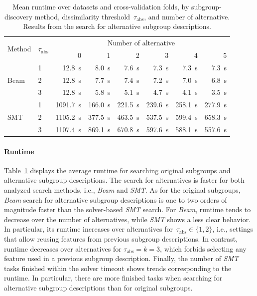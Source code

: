 \documentclass{article}
\theoremstyle{definition}
\begin{document}
\begin{table}[t]
	\centering
	\begin{tabular}{llrrrrrr}
		\toprule
		\multirow{2}{*}{Method} & \multirow{2}{*}{$\tau_{\text{abs}}$} & \multicolumn{6}{c}{Number of alternative} \\
		\cmidrule(lr){3-8}
		& &  0 & 1 & 2 & 3 & 4 & 5 \\
		\midrule
		\multirow[t]{3}{*}{Beam} & 1 & 12.8~s & 8.0~s & 7.6~s & 7.3~s & 7.3~s & 7.3~s \\
		& 2 & 12.8~s & 7.7~s & 7.4~s & 7.2~s & 7.0~s & 6.8~s \\
		& 3 & 12.8~s & 5.8~s & 5.1~s & 4.7~s & 4.1~s & 3.5~s \\
		\multirow[t]{3}{*}{SMT} & 1 & 1091.7~s & 166.0~s & 221.5~s & 239.6~s & 258.1~s & 277.9~s \\
		& 2 & 1105.2~s & 377.5~s & 463.5~s & 537.5~s & 599.4~s & 658.3~s \\
		& 3 & 1107.4~s & 869.1~s & 670.8~s & 597.6~s & 588.1~s & 557.6~s \\
		\bottomrule
	\end{tabular}
	\caption{
		Mean runtime over datasets and cross-validation folds, by subgroup-discovery method, dissimilarity threshold~$\tau_{\text{abs}}$, and number of alternative.
		Results from the search for alternative subgroup descriptions.
	}
	\label{tab:csd:alteratives-runtime}
\end{table}

\paragraph{Runtime}

Table~\ref{tab:csd:alteratives-runtime} displays the average runtime for searching original subgroups and alternative subgroup descriptions.
The search for alternatives is faster for both analyzed search methods, i.e., \emph{Beam} and \emph{SMT}.
As for the original subgroups, \emph{Beam} search for alternative subgroup descriptions is one to two orders of magnitude faster than the solver-based \emph{SMT} search.
For \emph{Beam}, runtime tends to decrease over the number of alternatives, while \emph{SMT} shows a less clear behavior.
In particular, its runtime increases over alternatives for~$\tau_{\text{abs}} \in \{1, 2\}$, i.e., settings that allow reusing features from previous subgroup descriptions.
In contrast, runtime decreases over alternatives for $\tau_{\text{abs}} = k = 3$, which forbids selecting any feature used in a previous subgroup description.
Finally, the number of \emph{SMT} tasks finished within the solver timeout shows trends corresponding to the runtime.
In particular, there are more finished tasks when searching for alternative subgroup descriptions than for original subgroups.
\end{document}
